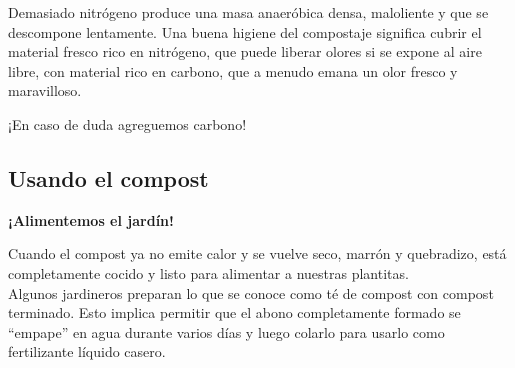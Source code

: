 \documentclass[../main.tex]{subfiles}
\begin{document}
Demasiado nitrógeno produce una masa anaeróbica densa, maloliente y que se descompone lentamente. Una buena higiene del compostaje significa cubrir el material fresco rico en nitrógeno, que puede liberar olores si se expone al aire libre, con material rico en carbono, que a menudo emana un olor fresco y maravilloso. \\

\begin{recuadroR}
    \centering
    {¡En caso de duda agreguemos carbono!}
\end{recuadroR}

\subsection{Usando el compost}
\centering
\textbf{¡Alimentemos el jardín!}\\[8pt]
\raggedright

Cuando el compost ya no emite calor y se vuelve seco, marrón y quebradizo, está completamente cocido y listo para alimentar a nuestras plantitas. \\



Algunos jardineros preparan lo que se conoce como té de compost con compost terminado. Esto implica permitir que el abono completamente formado se \enquote{empape} en agua durante varios días y luego colarlo para usarlo como fertilizante líquido casero.\\
\begin{table}[H]
    \centering\sffamily
    {%
    \def\arraystretch{1.5}%
    \caption*{\sffamily\color{CompostGreen!50!black}Tipos de compost más usados según dónde nos encontremos}}
    \label{distanciasiembra1}
\end{table}%
\end{document}
